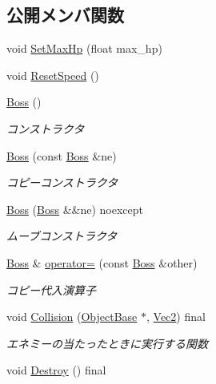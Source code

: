 \subsection*{公開メンバ関数}
\begin{DoxyCompactItemize}
\item 
void \mbox{\hyperlink{class_boss_a3085cbf44a8e918abac0a62a6e443cab}{Set\+Max\+Hp}} (float max\+\_\+hp)
\item 
void \mbox{\hyperlink{class_boss_a417e06b76510146b1e6c0e6841e4463c}{Reset\+Speed}} ()
\item 
\mbox{\hyperlink{class_boss_af287739a9fe8cb9501795656d34f3018}{Boss}} ()
\begin{DoxyCompactList}\small\item\em コンストラクタ \end{DoxyCompactList}\item 
\mbox{\hyperlink{class_boss_ae6bb99cbbbb4a5ae7db4d174e6f4b50e}{Boss}} (const \mbox{\hyperlink{class_boss}{Boss}} \&ne)
\begin{DoxyCompactList}\small\item\em コピーコンストラクタ \end{DoxyCompactList}\item 
\mbox{\hyperlink{class_boss_a2e8bacd64a0212e890c62febaa37c988}{Boss}} (\mbox{\hyperlink{class_boss}{Boss}} \&\&ne) noexcept
\begin{DoxyCompactList}\small\item\em ムーブコンストラクタ \end{DoxyCompactList}\item 
\mbox{\hyperlink{class_boss}{Boss}} \& \mbox{\hyperlink{class_boss_ae84c6b0e64de86f606f5ac1348045371}{operator=}} (const \mbox{\hyperlink{class_boss}{Boss}} \&other)
\begin{DoxyCompactList}\small\item\em コピー代入演算子 \end{DoxyCompactList}\item 
void \mbox{\hyperlink{class_boss_a36b664185c0aa3ae4c6fc58c33d8485b}{Collision}} (\mbox{\hyperlink{class_object_base}{Object\+Base}} $\ast$, \mbox{\hyperlink{common_8h_ae148fff5818e9444b4ab2288829559bf}{Vec2}}) final
\begin{DoxyCompactList}\small\item\em エネミーの当たったときに実行する関数 \end{DoxyCompactList}\item 
void \mbox{\hyperlink{class_boss_afe7a503ea624c30c2a50b58b40acfb48}{Destroy}} () final

\end{DoxyCompactItemize}

